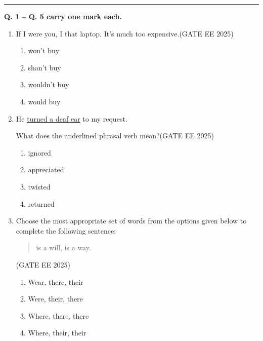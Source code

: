 



\rule{\columnwidth}{0.3pt}

\textbf{Q. 1 -- Q. 5 carry one mark each.}

\begin{enumerate}
\item If I were you, I \underline{\hspace{2.5cm}} that laptop. It’s much too expensive.\hfill {(GATE EE 2025)}

\begin{multicols}{2}
\begin{enumerate}
\item won’t buy
\item shan’t buy
\item wouldn’t buy
\item would buy
\end{enumerate}
\end{multicols}



\item He \underline{turned a deaf ear} to my request. 

What does the underlined phrasal verb mean?\hfill {(GATE EE 2025)}

\begin{multicols}{2}
\begin{enumerate}
\item ignored
\item appreciated
\item twisted
\item returned
\end{enumerate}
\end{multicols}


\item Choose the most appropriate set of words from the options given below to complete the following sentence:

\begin{quote}
\underline{\hspace{3cm}} \quad \underline{\hspace{3cm}} \quad is a will, \quad \underline{\hspace{3cm}} \quad is a way.
\end{quote}
\hfill {(GATE EE 2025)}
\begin{multicols}{2}
\begin{enumerate}
\item Wear, there, their
\item Were, their, there
\item Where, there, there
\item Where, their, their
\end{enumerate}
\end{multicols}




\end{enumerate}

